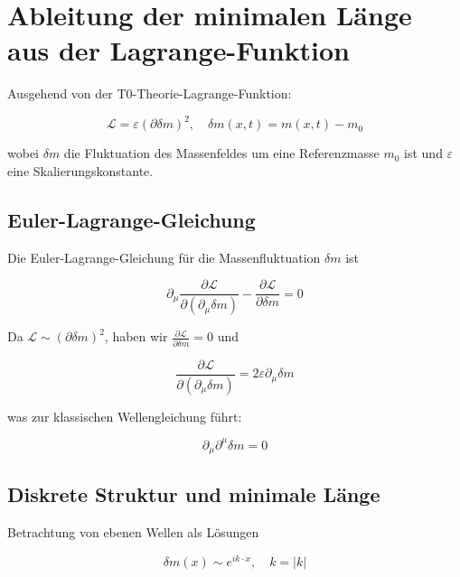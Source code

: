 \documentclass[12pt,a4paper]{article}
\numberwithin{equation}{section}
\begin{document}
	\section{Ableitung der minimalen Länge aus der Lagrange-Funktion}
	
	Ausgehend von der T0-Theorie-Lagrange-Funktion:
	
	\begin{equation}
		\mathcal{L} = \varepsilon (\partial \delta m)^2, \quad \delta m(x,t) = m(x,t) - m_0
	\end{equation}
	
	wobei $\delta m$ die Fluktuation des Massenfeldes um eine Referenzmasse $m_0$ ist und $\varepsilon$ eine Skalierungskonstante.
	
	\subsection{Euler-Lagrange-Gleichung}
	
	Die Euler-Lagrange-Gleichung für die Massenfluktuation $\delta m$ ist
	
	\begin{equation}
		\partial_\mu \frac{\partial \mathcal{L}}{\partial (\partial_\mu \delta m)} - \frac{\partial \mathcal{L}}{\partial \delta m} = 0
	\end{equation}
	
	Da $\mathcal{L} \sim (\partial \delta m)^2$, haben wir $\frac{\partial \mathcal{L}}{\partial \delta m} = 0$ und
	
	\begin{equation}
		\frac{\partial \mathcal{L}}{\partial (\partial_\mu \delta m)} = 2 \varepsilon \partial_\mu \delta m
	\end{equation}
	
	was zur klassischen Wellengleichung führt:
	
	\begin{equation}
		\partial_\mu \partial^\mu \delta m = 0
	\end{equation}
	
	\subsection{Diskrete Struktur und minimale Länge}
	
	Betrachtung von ebenen Wellen als Lösungen
	
	\begin{equation}
		\delta m(x) \sim e^{i k \cdot x}, \quad k = |k|
	\end{equation}
	
\end{document}
